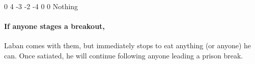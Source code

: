 \begin{multicols}{2}
  {0}%
  {4}%
  {{-3}%
  {-2}%
  {-4}}%
  {0}%
  {0}%
  {}%
  {Nothing}%
  {
    \setcounter{Brawl}{2}
    \setcounter{Combat}{1}
    \setcounter{Crafts}{1}
    \setcounter{Tactics}{1}
  }

\paragraph{If anyone stages a breakout,}
Laban comes with them, but immediately stops to eat anything (or anyone) he can.
Once satiated, he will continue following anyone leading a prison break.

\end{multicols}

